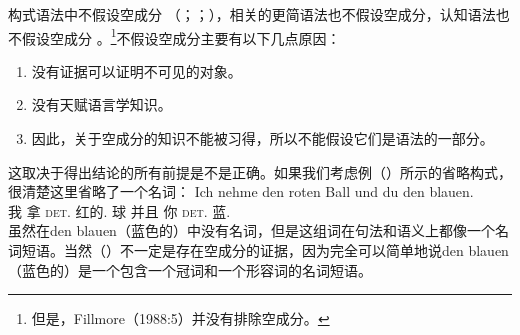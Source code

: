 构式语法中不假设空成分\indexcxgc\label{Seite-leere-Elemente-CxG} （\citealp[--50]{MR2001a}；\citealp[]{Goldberg2003b}；\citealp[]{Goldberg2006a}），相关的更简语法\citep{CJ2005a}也不假设空成分，认知语法也不假设空成分 。\footnote{%
  但是，Fillmore（1988:5）并没有排除空成分。
}不假设空成分主要有以下几点原因：
\begin{enumerate}
\item 没有证据可以证明不可见的对象。
\item 没有天赋语言学知识。
\item 因此，关于空成分的知识不能被习得，所以不能假设它们是语法的一部分。
\end{enumerate}
这取决于得出结论的所有前提是不是正确。如果我们考虑例（）所示的省略构式，很清楚这里省略了一个名词：
\ea
\gll Ich nehme den roten Ball und du den blauen.\\
	 我 拿 \textsc{det}.\acc{} 红的.\acc{} 球 并且 你 \textsc{det}.\acc{} 蓝.\acc{}\\
\z
虽然在den blauen（蓝色的）中没有名词，但是这组词在句法和语义上都像一个名词短语。当然（）不一定是存在空成分的证据，因为完全可以简单地说den blauen（蓝色的）是一个包含一个冠词和一个形容词的名词短语\citep{Wunderlich87d}。

